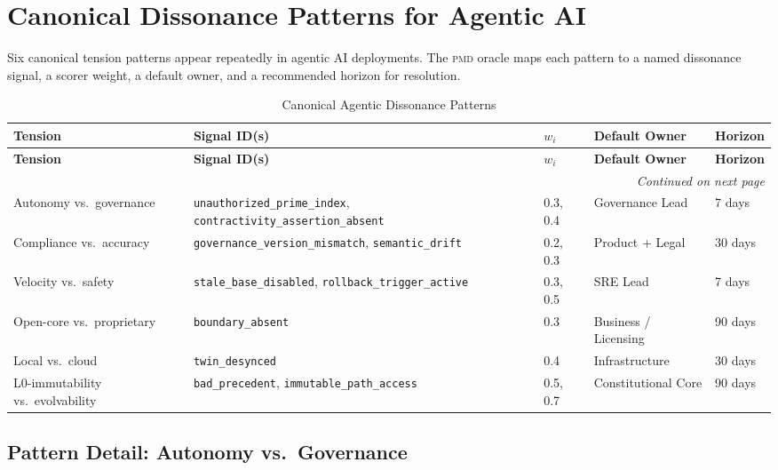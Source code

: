 \documentclass[11pt,letterpaper]{article}
\theoremstyle{remark}
\newcommand{\pmd}{\textsc{pmd}}
\begin{document}
\section{Canonical Dissonance Patterns for Agentic AI}
\label{sec:patterns}

Six canonical tension patterns appear repeatedly in agentic AI deployments.
The \pmd{} oracle maps each pattern to a named dissonance signal, a scorer
weight, a default owner, and a recommended horizon for resolution.

\begin{longtable}{p{2.8cm}p{3.2cm}p{1.4cm}p{2.4cm}p{2.4cm}}
\caption{Canonical Agentic Dissonance Patterns}
\label{tab:patterns}\\
\toprule
\textbf{Tension} & \textbf{Signal ID(s)} & \textbf{$w_i$} &
\textbf{Default Owner} & \textbf{Horizon} \\
\midrule
\endfirsthead
\toprule
\textbf{Tension} & \textbf{Signal ID(s)} & \textbf{$w_i$} &
\textbf{Default Owner} & \textbf{Horizon} \\
\midrule
\endhead
\midrule
\multicolumn{5}{r}{\small\textit{Continued on next page}}\\
\endfoot
\bottomrule
\endlastfoot
%
Autonomy vs.\ governance
  & \texttt{unauthorized\_prime\_index},
    \texttt{contractivity\_assertion\_absent}
  & 0.3, 0.4
  & Governance Lead
  & 7 days \\[4pt]
%
Compliance vs.\ accuracy
  & \texttt{governance\_version\_mismatch},
    \texttt{semantic\_drift}
  & 0.2, 0.3
  & Product + Legal
  & 30 days \\[4pt]
%
Velocity vs.\ safety
  & \texttt{stale\_base\_disabled},
    \texttt{rollback\_trigger\_active}
  & 0.3, 0.5
  & SRE Lead
  & 7 days \\[4pt]
%
Open-core vs.\ proprietary
  & \texttt{boundary\_absent}
  & 0.3
  & Business / Licensing
  & 90 days \\[4pt]
%
Local vs.\ cloud
  & \texttt{twin\_desynced}
  & 0.4
  & Infrastructure
  & 30 days \\[4pt]
%
L0-immutability vs.\ evolvability
  & \texttt{bad\_precedent},
    \texttt{immutable\_path\_access}
  & 0.5, 0.7
  & Constitutional Core
  & 90 days \\
\end{longtable}

\subsection{Pattern Detail: Autonomy vs.\ Governance}
\end{document}

